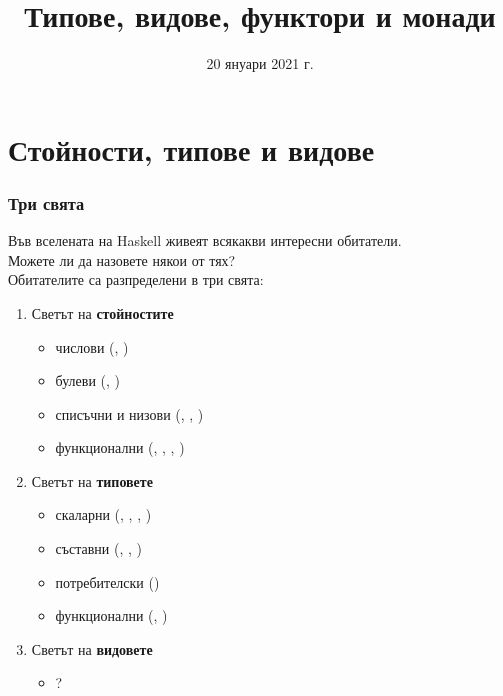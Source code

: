 \documentclass[alsotrans]{beamerswitch}
\institute[ФП 20/21]{\small Функционално програмиране, 2020/21 г.}
\title{Типове, видове, функтори и монади}
\date{20 януари 2021 г.}
\begin{document}
\begin{frame}
  \titlepage
\end{frame}

\section{Стойности, типове и видове}

\begin{frame}[fragile]
  \frametitle{Три свята}
  Във вселената на Haskell живеят всякакви интересни обитатели.\\
  Можете ли да назовете някои от тях?\pause\\[2ex]
  Обитателите са разпределени в три свята:\pause
  \begin{enumerate}[<+->]
    \small
  \item Светът на \textbf{стойностите}
    \begin{itemize}
    \item числови (, )
    \item булеви (, )
    \item списъчни и низови (\lst{[1, 2, 3]}, , \lst{[]})
    \item функционални (, \lst{(+)}, , )
    \end{itemize}
  \item Светът на \textbf{типовете}
    \begin{itemize}
    \item скаларни (, , , )
    \item съставни (\lst{[Int]}, , )
    \item потребителски ()
    \item функционални (, )
    \end{itemize}
  \item Светът на \textbf{видовете}
    \begin{itemize}
    \item \alert{?}
    \end{itemize}
  \end{enumerate}
\end{frame}
\end{document}
